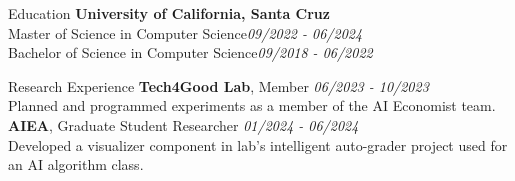 \documentclass{resume} %
\begin{document}
\begin{rSection}{Education}
{\bf University of California, Santa Cruz}\\
Master of Science in Computer Science\hfill {\em 09/2022 - 06/2024}
\\ Bachelor of Science in Computer Science\hfill {\em 09/2018 - 06/2022}  

\end{rSection}
\begin{rSection}{Research Experience}
{\bf Tech4Good Lab}{, Member} \hfill {\em 06/2023 - 10/2023}\\
Planned and programmed experiments as a member of the AI Economist team. \\
{\bf AIEA}{, Graduate Student Researcher} \hfill {\em 01/2024 - 06/2024}\\
Developed a visualizer component in lab's intelligent auto-grader project used for an AI algorithm class. 
\end{rSection}
\end{document}
